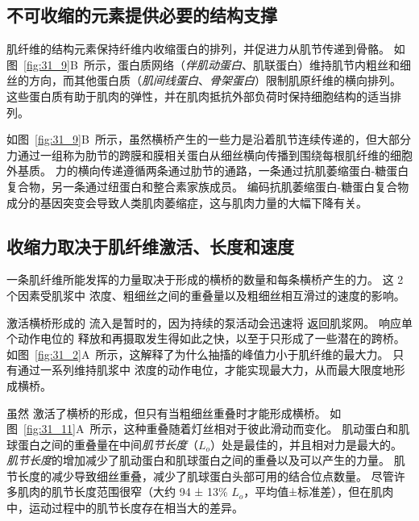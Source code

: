 \subsection{不可收缩的元素提供必要的结构支撑}

肌纤维的结构元素保持纤维内收缩蛋白的排列，并促进力从肌节传递到骨骼。
如图~\ref{fig:31_9}B~所示，蛋白质网络（\textit{伴肌动蛋白}、肌联蛋白）维持肌节内粗丝和细丝的方向，而其他蛋白质（\textit{肌间线蛋白}、\textit{骨架蛋白}）限制肌原纤维的横向排列。
这些蛋白质有助于肌肉的弹性，并在肌肉抵抗外部负荷时保持细胞结构的适当排列。


如图~\ref{fig:31_9}B~所示，虽然横桥产生的一些力是沿着肌节连续传递的，但大部分力通过一组称为肋节的跨膜和膜相关蛋白从细丝横向传播到围绕每根肌纤维的细胞外基质。
力的横向传递遵循两条通过肋节的通路，一条通过抗肌萎缩蛋白-糖蛋白复合物，另一条通过纽蛋白和整合素家族成员。
编码抗肌萎缩蛋白-糖蛋白复合物成分的基因突变会导致人类肌肉萎缩症，这与肌肉力量的大幅下降有关。



\subsection{收缩力取决于肌纤维激活、长度和速度}

一条肌纤维所能发挥的力量取决于形成的横桥的数量和每条横桥产生的力。
这 2 个因素受肌浆中  浓度、粗细丝之间的重叠量以及粗细丝相互滑过的速度的影响。


激活横桥形成的  流入是暂时的，因为持续的泵活动会迅速将  返回肌浆网。
响应单个动作电位的  释放和再摄取发生得如此之快，以至于只形成了一些潜在的跨桥。
如图~\ref{fig:31_2}A~所示，这解释了为什么抽搐的峰值力小于肌纤维的最大力。
只有通过一系列维持肌浆中  浓度的动作电位，才能实现最大力，从而最大限度地形成横桥。


虽然  激活了横桥的形成，但只有当粗细丝重叠时才能形成横桥。
如图~\ref{fig:31_11}A~所示，这种重叠随着灯丝相对于彼此滑动而变化。 
肌动蛋白和肌球蛋白之间的重叠量在中间\textit{肌节长度}（$ L_o $）处是最佳的，并且相对力是最大的。
\textit{肌节长度}的增加减少了肌动蛋白和肌球蛋白之间的重叠以及可以产生的力量。
肌节长度的减少导致细丝重叠，减少了肌球蛋白头部可用的结合位点数量。
尽管许多肌肉的肌节长度范围很窄（大约 94 ± 13\% $ L_o $，平均值±标准差），但在肌肉中，运动过程中的肌节长度存在相当大的差异。


